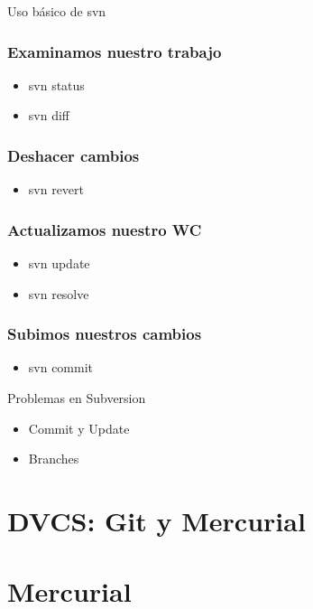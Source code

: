 \documentclass[spanish]{beamer}
\begin{document}
\begin{subsection}{Uso básico de svn}
\begin{frame}[fragile]
\frametitle{Examinamos nuestro trabajo}
\begin{itemize}
\item svn status
\item svn diff
\end{itemize}
\end{frame}

\begin{frame}[fragile]
\frametitle{Deshacer cambios}
\begin{itemize}
\item svn revert
\end{itemize}
\end{frame}


\begin{frame}[fragile]
\frametitle{Actualizamos nuestro WC}
\begin{itemize}
\item svn update
\item svn resolve
\end{itemize}
\end{frame}

\begin{frame}[fragile]
\frametitle{Subimos nuestros cambios}
\begin{itemize}
\item svn commit
\end{itemize}
\end{frame}
\end{subsection}


        \begin{frame}{Problemas en Subversion}
           \begin{itemize}
              \item Commit y Update
              \item Branches
           \end{itemize}
	\end{frame}
        \section{DVCS: Git y Mercurial}


        \section{Mercurial}
        
\end{document}
